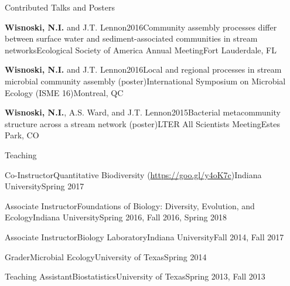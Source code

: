 \documentclass{resume} %
\begin{document}
\begin{rhangSection}{Contributed Talks and Posters}
  \begin{Presentation}{{\bf Wisnoski, N.I.} and J.T. Lennon}{2016}{Community assembly processes differ between surface water and sediment-associated communities in stream networks}{Ecological Society of America Annual Meeting}{Fort Lauderdale, FL}
  \end{Presentation}

  \begin{Presentation}{{\bf Wisnoski, N.I.} and J.T. Lennon}{2016}{Local and regional processes in stream microbial community assembly (poster)}{International Symposium on Microbial Ecology (ISME 16)}{Montreal, QC}
  \end{Presentation}

  \begin{Presentation}{{\bf Wisnoski, N.I.}, A.S. Ward, and J.T. Lennon}{2015}{Bacterial metacommunity structure across a stream network (poster)}{LTER All Scientists Meeting}{Estes Park, CO}
  \end{Presentation}

\end{rhangSection}

\bigskip

\begin{rSection}{Teaching}

\begin{Course}
  {Co-Instructor}{Quantitative Biodiversity (\url{https://goo.gl/y4oK7c})}{Indiana University}{Spring 2017}
\end{Course}

\begin{Course}
  {Associate Instructor}{Foundations of Biology: Diversity, Evolution, and Ecology}{Indiana University}{Spring 2016, Fall 2016, Spring 2018}
\end{Course}

\begin{Course}
  {Associate Instructor}{Biology Laboratory}{Indiana University}{Fall 2014, Fall 2017}
\end{Course}

\begin{Course}
  {Grader}{Microbial Ecology}{University of Texas}{Spring 2014}
\end{Course}

\begin{Course}
  {Teaching Assistant}{Biostatistics}{University of Texas}{Spring 2013, Fall 2013}
\end{Course}

\end{rSection}
\end{document}
